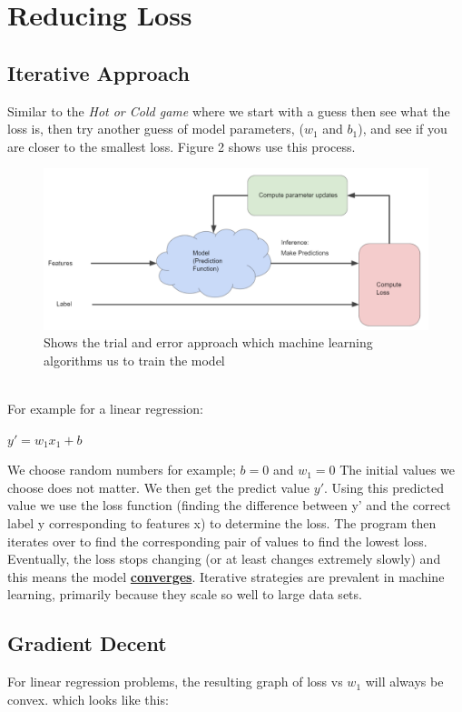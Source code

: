\documentclass[12pt]{article}
\begin{document}
\section{Reducing Loss}
\subsection{Iterative Approach}
Similar to the \textit{Hot or Cold game} where we start with a guess then see what the loss is, then try another guess of model parameters, ($w_1$ and $b_1$), and see if you are closer to the smallest loss. Figure 2 shows use this process.
\begin{figure}[h]
\includegraphics[scale = 0.5]{imgs/Iterative Approach.PNG}
\centering
\caption{Shows the trial and error approach which machine learning algorithms us to train the model}
\end{figure}
\\For example for a linear regression:
\begin{center}
$y' = w_1x_1 + b$
\end{center}

We choose random numbers for example;
$b = 0$ and $w_1 = 0$
The initial values we choose does not matter. We then get the predict value $y'$. Using this predicted value we use the loss function (finding the difference between y' and the correct label y corresponding to features x) to determine the loss. The program then iterates over to find the corresponding pair of values to find the lowest loss. Eventually, the loss stops changing (or at least changes extremely slowly) and this means the model \href{https://developers.google.com/machine-learning/glossary#convergence}{\textbf{converges}}. Iterative strategies are prevalent in machine learning, primarily because they scale so well to large data sets.
\subsection{Gradient Decent}
For linear regression problems, the resulting graph of loss vs $w_1$ will always be convex. which looks like this:
\end{document}
